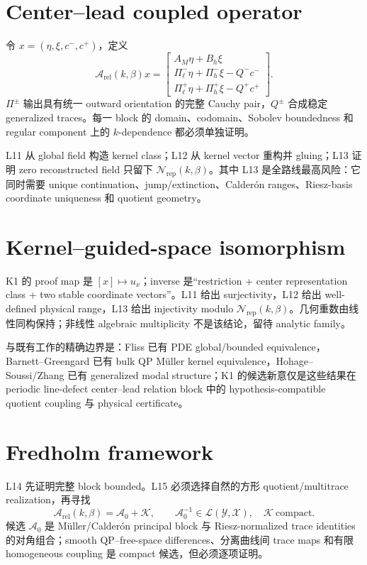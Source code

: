 \documentclass[UTF8,11pt,fontset=none]{ctexart}
\theoremstyle{definition}
\newcommand{\Arel}{\mathcal A_{\mathrm{rel}}(k,\beta)}
\newcommand{\Nrep}{\mathcal N_{\mathrm{rep}}(k,\beta)}
\begin{document}
\section{Center--lead coupled operator}

令 $x=(\eta,\xi,c^-,c^+)$，定义
\[
\Arel x=
\begin{bmatrix}
A_M\eta+B_h\xi\\
\Pi^-_\ell\eta+\Pi^-_h\xi-Q^-c^-\\
\Pi^+_\ell\eta+\Pi^+_h\xi-Q^+c^+
\end{bmatrix}.
\]
$\Pi^\pm$ 输出具有统一 outward orientation 的完整 Cauchy pair，$Q^\pm$ 合成稳定 generalized traces。每一 block 的 domain、codomain、Sobolev boundedness 和 regular component 上的 $k$-dependence 都必须单独证明。

L11 从 global field 构造 kernel class；L12 从 kernel vector 重构并 gluing；L13 证明 zero reconstructed field 只留下 $\Nrep$。其中 L13 是全路线最高风险：它同时需要 unique continuation、jump/extinction、Calderón ranges、Riesz-basis coordinate uniqueness 和 quotient geometry。

\section{Kernel--guided-space isomorphism}

K1 的 proof map 是 $[x]\mapsto u_x$；inverse 是“restriction + center representation class + two stable coordinate vectors”。L11 给出 surjectivity，L12 给出 well-defined physical range，L13 给出 injectivity modulo $\Nrep$。几何重数由线性同构保持；非线性 algebraic multiplicity 不是该结论，留待 analytic family。

与既有工作的精确边界是：Fliss 已有 PDE global/bounded equivalence，Barnett--Greengard 已有 bulk QP Müller kernel equivalence，Hohage--Soussi/Zhang 已有 generalized modal structure；K1 的候选新意仅是这些结果在 periodic line-defect center--lead relation block 中的 hypothesis-compatible quotient coupling 与 physical certificate。

\section{Fredholm framework}

L14 先证明完整 block bounded。L15 必须选择自然的方形 quotient/multitrace realization，再寻找
\[
\Arel=\mathcal A_0+\mathcal K,
\qquad \mathcal A_0^{-1}\in\mathcal L(\mathcal Y,\mathcal X),\quad
\mathcal K\ \text{compact}.
\]
候选 $\mathcal A_0$ 是 Müller/Calderón principal block 与 Riesz-normalized trace identities 的对角组合；smooth QP--free-space differences、分离曲线间 trace maps 和有限 homogeneous coupling 是 compact 候选，但必须逐项证明。
\end{document}
